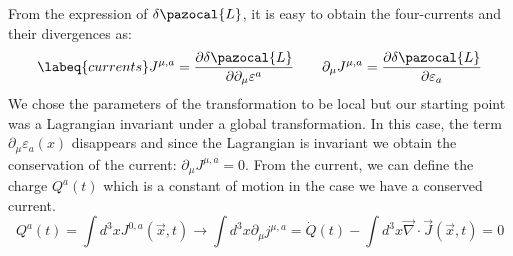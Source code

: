 \documentclass[../main.tex]{subfiles}
\begin{document}
\begin{kaobox}[frametitle=N\"other's Theorem]
\[\]
From the expression of $\delta\pazocal{L}$, it is easy to obtain the four-currents and their divergences as:
\begin{equation}
\labeq{currents}
J^{\mu,a}=\frac{\partial\delta\pazocal{L}}{\partial\partial_\mu\varepsilon^a} \qquad \partial_\mu J^{\mu,a}=\frac{\partial\delta\pazocal{L}}{\partial\varepsilon_a}
\end{equation}
We chose the parameters of the transformation to be local but our starting point was a Lagrangian invariant under a global transformation. In this case, the term $\partial_\mu\varepsilon_a(x)$ disappears and since the Lagrangian is invariant we obtain the conservation of the current: $\partial_\mu J^{\mu,a}=0$. From the current, we can define the charge $Q^a(t)$ which is a constant of motion in the case we have a conserved current.
\[
Q^a(t)=\int d^3xJ^{0,a}(\Vec{x},t)\to\int d^3x\partial_\mu j^{\mu,a}=\Dot{Q}(t)-\int d^3x\Vec{\nabla}\cdot\Vec{J}(\Vec{x},t)=0
\]
\end{kaobox}
\end{document}
